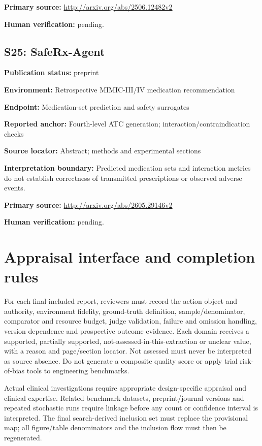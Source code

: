 \documentclass[journal,onecolumn,10pt]{IEEEtran}
\begin{document}
\noindent\textbf{Primary source:} \url{http://arxiv.org/abs/2506.12482v2}\par
\noindent\textbf{Human verification:} pending.

\subsection*{S25: SafeRx-Agent}

\noindent\textbf{Publication status:} preprint\par

\noindent\textbf{Environment:} Retrospective MIMIC-III/IV medication recommendation\par

\noindent\textbf{Endpoint:} Medication-set prediction and safety surrogates\par

\noindent\textbf{Reported anchor:} Fourth-level ATC generation; interaction/contraindication checks\par

\noindent\textbf{Source locator:} Abstract; methods and experimental sections\par

\noindent\textbf{Interpretation boundary:} Predicted medication sets and interaction metrics do not establish correctness of transmitted prescriptions or observed adverse events.\par

\noindent\textbf{Primary source:} \url{http://arxiv.org/abs/2605.29146v2}\par
\noindent\textbf{Human verification:} pending.

\section{Appraisal interface and completion rules}
For each final included report, reviewers must record the action object and authority, environment fidelity, ground-truth definition, sample/denominator, comparator and resource budget, judge validation, failure and omission handling, version dependence and prospective outcome evidence. Each domain receives a supported, partially supported, not-assessed-in-this-extraction or unclear value, with a reason and page/section locator. Not assessed must never be interpreted as source absence. Do not generate a composite quality score or apply trial risk-of-bias tools to engineering benchmarks.

Actual clinical investigations require appropriate design-specific appraisal and clinical expertise. Related benchmark datasets, preprint/journal versions and repeated stochastic runs require linkage before any count or confidence interval is interpreted. The final search-derived inclusion set must replace the provisional map; all figure/table denominators and the inclusion flow must then be regenerated.
\end{document}
